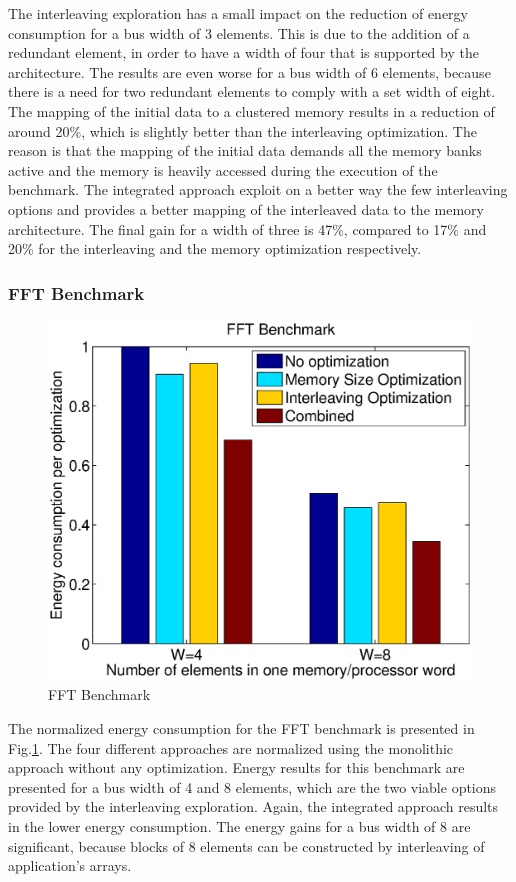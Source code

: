 \documentclass[prodmode,acmtecs]{acmsmall}
\begin{document}
 The interleaving exploration has a small impact on the reduction of energy consumption for a bus width of 3 elements.
 This is due to the addition of a redundant element, in order to have a width of four that is supported by the architecture.
The results are even worse for a bus width of 6 elements, because there is a need for two redundant elements to comply with a set width of eight.
The mapping of the initial data to a clustered memory results in a reduction of around 20\%, which is slightly better than the interleaving optimization.
The reason is that the mapping of the initial data demands all the memory banks active and the memory is heavily accessed during the execution of the benchmark.
The integrated approach exploit on a better way the few interleaving options and provides a better mapping of the interleaved data to the memory architecture.
The final gain for a width of three is 47\%, compared to 17\% and 20\% for the interleaving and the memory optimization respectively.

\subsubsection{FFT Benchmark}

\begin{figure}
\centering
	\includegraphics[scale = 0.5]{Images/fft.eps} 
	\caption{FFT Benchmark}
	\label{fig:fft}
\end{figure}

The normalized energy consumption for the FFT benchmark is presented in Fig.\ref{fig:fft}.
The four different approaches are normalized using the monolithic approach without any optimization.
Energy results for this benchmark are presented for a bus width of 4 and 8 elements, which are the two viable options provided by the interleaving exploration.
Again, the integrated approach results in the lower energy consumption.
The energy gains for a bus width of 8 are significant, because blocks of 8 elements can be constructed by interleaving of application's arrays.
\end{document}
